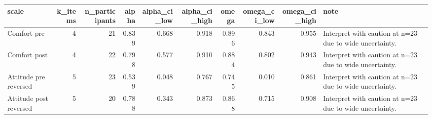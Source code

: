 \begin{tabular}{lrrrrrrrrl}
\toprule
scale & k_items & n_participants & alpha & alpha_ci_low & alpha_ci_high & omega & omega_ci_low & omega_ci_high & note \\
\midrule
Comfort pre & 4 & 21 & 0.839 & 0.668 & 0.918 & 0.896 & 0.843 & 0.955 & Interpret with caution at n=23 due to wide uncertainty. \\
Comfort post & 4 & 22 & 0.798 & 0.577 & 0.910 & 0.884 & 0.802 & 0.943 & Interpret with caution at n=23 due to wide uncertainty. \\
Attitude pre reversed & 5 & 23 & 0.539 & 0.048 & 0.767 & 0.745 & 0.010 & 0.861 & Interpret with caution at n=23 due to wide uncertainty. \\
Attitude post reversed & 5 & 20 & 0.788 & 0.343 & 0.873 & 0.868 & 0.715 & 0.908 & Interpret with caution at n=23 due to wide uncertainty. \\
\bottomrule
\end{tabular}

